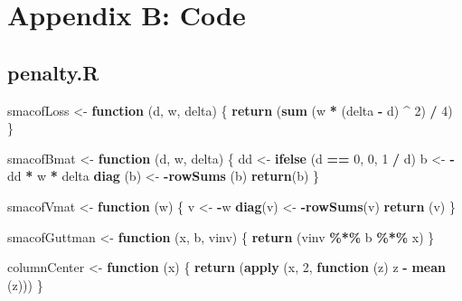 \documentclass[
  12pt,
]{article}
\newenvironment{Shaded}{\begin{snugshade}}{\end{snugshade}}
\newcommand{\ControlFlowTok}[1]{\textcolor[rgb]{0.13,0.29,0.53}{\textbf{#1}}}
\newcommand{\DecValTok}[1]{\textcolor[rgb]{0.00,0.00,0.81}{#1}}
\newcommand{\FunctionTok}[1]{\textcolor[rgb]{0.13,0.29,0.53}{\textbf{#1}}}
\newcommand{\NormalTok}[1]{#1}
\newcommand{\OtherTok}[1]{\textcolor[rgb]{0.56,0.35,0.01}{#1}}
\newcommand{\SpecialCharTok}[1]{\textcolor[rgb]{0.81,0.36,0.00}{\textbf{#1}}}
\begin{document}
\hypertarget{appendix-b-code}{%
\section{Appendix B: Code}\label{appendix-b-code}}

\hypertarget{penalty.r}{%
\subsection{penalty.R}\label{penalty.r}}

\begin{Shaded}
\begin{Highlighting}[]
\NormalTok{smacofLoss }\OtherTok{\textless{}{-}} \ControlFlowTok{function}\NormalTok{ (d, w, delta) \{}
  \FunctionTok{return}\NormalTok{ (}\FunctionTok{sum}\NormalTok{ (w }\SpecialCharTok{*}\NormalTok{ (delta }\SpecialCharTok{{-}}\NormalTok{ d) }\SpecialCharTok{\^{}} \DecValTok{2}\NormalTok{) }\SpecialCharTok{/} \DecValTok{4}\NormalTok{)}
\NormalTok{\}}

\NormalTok{smacofBmat }\OtherTok{\textless{}{-}} \ControlFlowTok{function}\NormalTok{ (d, w, delta) \{}
\NormalTok{  dd }\OtherTok{\textless{}{-}} \FunctionTok{ifelse}\NormalTok{ (d }\SpecialCharTok{==} \DecValTok{0}\NormalTok{, }\DecValTok{0}\NormalTok{, }\DecValTok{1} \SpecialCharTok{/}\NormalTok{ d)}
\NormalTok{  b }\OtherTok{\textless{}{-}} \SpecialCharTok{{-}}\NormalTok{dd }\SpecialCharTok{*}\NormalTok{ w }\SpecialCharTok{*}\NormalTok{ delta}
  \FunctionTok{diag}\NormalTok{ (b) }\OtherTok{\textless{}{-}} \SpecialCharTok{{-}}\FunctionTok{rowSums}\NormalTok{ (b)}
  \FunctionTok{return}\NormalTok{(b)}
\NormalTok{\}}

\NormalTok{smacofVmat }\OtherTok{\textless{}{-}} \ControlFlowTok{function}\NormalTok{ (w) \{}
\NormalTok{  v }\OtherTok{\textless{}{-}} \SpecialCharTok{{-}}\NormalTok{w}
  \FunctionTok{diag}\NormalTok{(v) }\OtherTok{\textless{}{-}} \SpecialCharTok{{-}}\FunctionTok{rowSums}\NormalTok{(v)}
  \FunctionTok{return}\NormalTok{ (v)}
\NormalTok{\}}

\NormalTok{smacofGuttman }\OtherTok{\textless{}{-}} \ControlFlowTok{function}\NormalTok{ (x, b, vinv) \{}
  \FunctionTok{return}\NormalTok{ (vinv }\SpecialCharTok{\%*\%}\NormalTok{ b }\SpecialCharTok{\%*\%}\NormalTok{ x)}
\NormalTok{\}}

\NormalTok{columnCenter }\OtherTok{\textless{}{-}} \ControlFlowTok{function}\NormalTok{ (x) \{}
  \FunctionTok{return}\NormalTok{ (}\FunctionTok{apply}\NormalTok{ (x, }\DecValTok{2}\NormalTok{, }\ControlFlowTok{function}\NormalTok{ (z) z }\SpecialCharTok{{-}} \FunctionTok{mean}\NormalTok{ (z)))}
\NormalTok{\}}


\end{Highlighting}
\end{Shaded}
\end{document}
